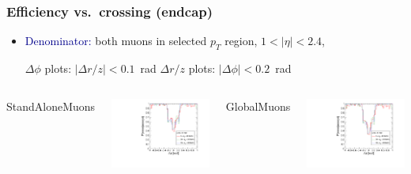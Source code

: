 \documentclass[compress]{beamer}
\begin{document}
\begin{frame}
\frametitle{Efficiency vs.\ crossing (endcap)}
\begin{itemize}
\item \textcolor{darkblue}{Denominator:} both muons in selected $p_T$ region, $1 < |\eta| < 2.4$,

$\Delta \phi$ plots: $|\Delta r/z| < 0.1$~rad \hfill $\Delta r/z$ plots: $|\Delta \phi| < 0.2$~rad
\end{itemize}

\vfill
\begin{columns}
\centering StandAloneMuons

\includegraphics[width=\linewidth]{endcap_dphi_bypt_StandAloneMuon.pdf}

\centering GlobalMuons

\includegraphics[width=\linewidth]{endcap_dphi_bypt_GlobalMuon.pdf}


\end{columns}
\end{frame}
\end{document}
